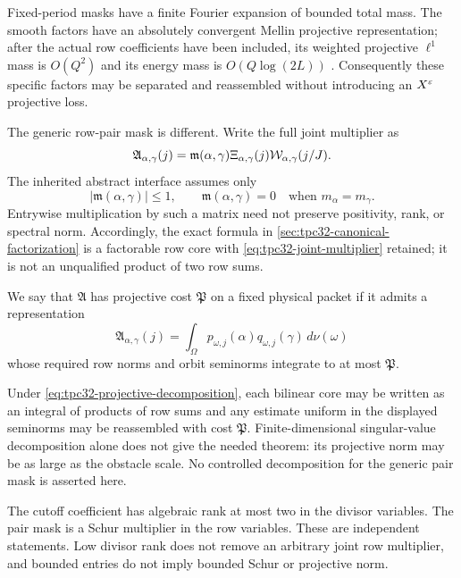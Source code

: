 Fixed-period masks have a finite Fourier expansion of bounded total mass.
The smooth factors have an absolutely convergent Mellin projective
representation; after the actual row coefficients have been included, its
weighted projective $\ell^1$ mass is $O(Q^2)$ and its energy mass is
$O(Q\log(2L))$ \citep{WangTPC25}.  Consequently these specific factors may
be separated and reassembled without introducing an $X^\varepsilon$ projective
loss.

The generic row-pair mask is different.  Write the full joint multiplier as
\begin{equation}
 \mathfrak A_{\alpha,\gamma}(j)
 =\mathfrak m(\alpha,\gamma)
   \Xi_{\alpha,\gamma}(j)
   \mathcal W_{\alpha,\gamma}(j/J).
 \label{eq:tpc32-joint-multiplier-boundary}
\end{equation}
The inherited abstract interface assumes only
\begin{equation}
 |\mathfrak m(\alpha,\gamma)|\le1,
 \qquad
 \mathfrak m(\alpha,\gamma)=0
 \quad\text{when }m_\alpha=m_\gamma.
 \label{eq:tpc32-mask-bound}
\end{equation}
Entrywise multiplication by such a matrix need not preserve positivity,
rank, or spectral norm.  Accordingly, the exact formula in
\cref{sec:tpc32-canonical-factorization} is a factorable row core with
\eqref{eq:tpc32-joint-multiplier} retained; it is not an unqualified product
of two row sums.

\begin{definition}
\label{def:tpc32-projective-multiplier}
We say that $\mathfrak A$ has projective cost $\mathfrak P$ on a fixed
physical packet if it admits a representation
\begin{equation}
 \mathfrak A_{\alpha,\gamma}(j)
 =\int_\Omega p_{\omega,j}(\alpha)q_{\omega,j}(\gamma)
 \,d\nu(\omega)
 \label{eq:tpc32-projective-decomposition}
\end{equation}
whose required row norms and orbit seminorms integrate to at most
$\mathfrak P$.
\end{definition}

Under \eqref{eq:tpc32-projective-decomposition}, each bilinear core may be
written as an integral of products of row sums and any estimate uniform in
the displayed seminorms may be reassembled with cost $\mathfrak P$.
Finite-dimensional singular-value decomposition alone does not give the
needed theorem: its projective norm may be as large as the obstacle scale.
No controlled decomposition for the generic pair mask is asserted here.

\begin{remark}
The cutoff coefficient has algebraic rank at most two in the divisor
variables.  The pair mask is a Schur multiplier in the row variables.
These are independent statements.  Low divisor rank does not remove an
arbitrary joint row multiplier, and bounded entries do not imply bounded
Schur or projective norm.
\end{remark}
